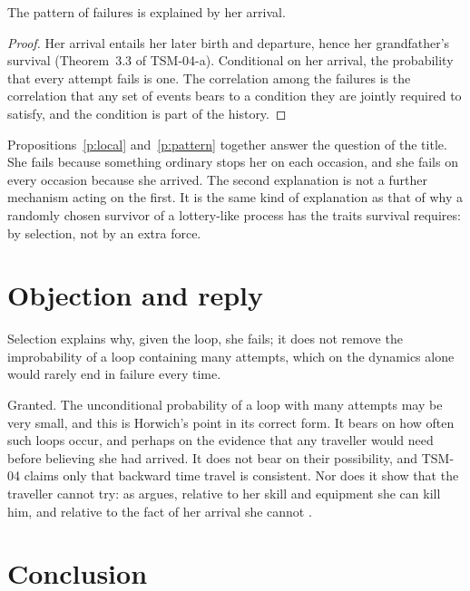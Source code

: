 \documentclass{situationist-preprint}
\begin{document}
\begin{proposition}\label{p:pattern}
The pattern of failures is explained by her arrival.
\end{proposition}

\begin{proof}
Her arrival entails her later birth and departure, hence her grandfather's survival (Theorem~3.3 of TSM-04-a). Conditional on her arrival, the probability that every attempt fails is one. The correlation among the failures is the correlation that any set of events bears to a condition they are jointly required to satisfy, and the condition is part of the history.
\end{proof}

Propositions~\ref{p:local} and~\ref{p:pattern} together answer the question of the title. She fails because something ordinary stops her on each occasion, and she fails on every occasion because she arrived. The second explanation is not a further mechanism acting on the first. It is the same kind of explanation as that of why a randomly chosen survivor of a lottery-like process has the traits survival requires: by selection, not by an extra force.

\section{Objection and reply}

\begin{objection}
Selection explains why, given the loop, she fails; it does not remove the improbability of a loop containing many attempts, which on the dynamics alone would rarely end in failure every time.
\end{objection}

\begin{reply}
Granted. The unconditional probability of a loop with many attempts may be very small, and this is Horwich's point in its correct form. It bears on how often such loops occur, and perhaps on the evidence that any traveller would need before believing she had arrived. It does not bear on their possibility, and TSM-04 claims only that backward time travel is consistent. Nor does it show that the traveller cannot try: as \citet{Lewis1976} argues, relative to her skill and equipment she can kill him, and relative to the fact of her arrival she cannot \citep[cf.][]{Vihvelin1996}.
\end{reply}

\section{Conclusion}
\end{document}
